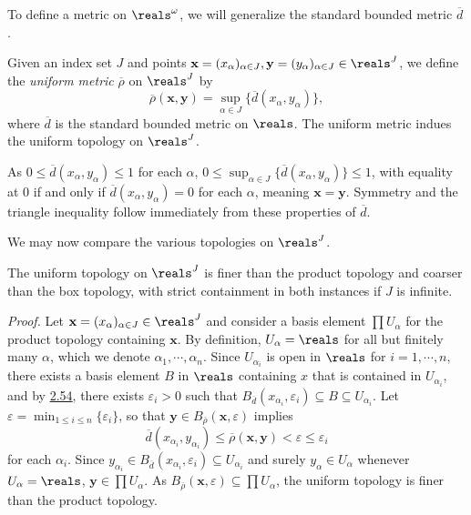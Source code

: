 To define a metric on $\reals^\omega$, we will generalize the standard bounded metric $\overline{d}$.
\begin{definition}\label{2.61}
    Given an index set $J$ and points $\mathbf{x} = (x_\alpha)_{\alpha \in J}, \mathbf{y} = (y_\alpha)_{\alpha \in J} \in \reals^J$, we define the {\it uniform metric} $\overline{\rho}$ on $\reals^J$ by
    $$\overline{\rho}(\mathbf{x}, \mathbf{y}) = \sup_{\alpha \in J} \{\overline{d}(x_\alpha, y_\alpha)\},$$
    where $\overline{d}$ is the standard bounded metric on $\reals$. The uniform metric indues the uniform topology on $\reals^J$.
\end{definition}
As $0 \leq \overline{d}(x_\alpha, y_\alpha) \leq 1$ for each $\alpha$, $0 \leq \sup_{\alpha \in J} \{\overline{d}(x_\alpha, y_\alpha)\} \leq 1$, with equality at $0$ if and only if $\overline{d}(x_\alpha, y_\alpha) = 0$ for each $\alpha$, meaning $\mathbf{x} = \mathbf{y}$. Symmetry and the triangle inequality follow immediately from these properties of $\overline{d}$.

We may now compare the various topologies on $\reals^J$.
\begin{theorem}\label{2.62}
    The uniform topology on $\reals^J$ is finer than the product topology and coarser than the box topology, with strict containment in both instances if $J$ is infinite.
\end{theorem}
{\it Proof.} Let $\mathbf{x} = (x_\alpha)_{\alpha \in J} \in \reals^J$ and consider a basis element $\prod U_\alpha$ for the product topology containing $\mathbf{x}$. By definition, $U_\alpha = \reals$ for all but finitely many $\alpha$, which we denote $\alpha_1, \cdots, \alpha_n$. Since $U_{\alpha_i}$ is open in $\reals$ for $i = 1, \cdots, n,$ there exists a basis element $B$ in $\reals$ containing $x$ that is contained in $U_{\alpha_i}$, and by \hyperref[2.54]{2.54}, there exists $\varepsilon_i > 0$ such that $B_{\overline{d}}(x_{\alpha_i}, \varepsilon_i) \subseteq B \subseteq U_{\alpha_i}$. Let $\varepsilon = \min_{1 \leq i \leq n} \{\varepsilon_i\}$, so that $\mathbf{y} \in B_{\overline{\rho}}(\mathbf{x}, \varepsilon)$ implies
$$\overline{d}(x_{\alpha_i}, y_{\alpha_i}) \leq \overline{\rho}(\mathbf{x}, \mathbf{y}) < \varepsilon \leq \varepsilon_i$$
for each $\alpha_i$. Since $y_{\alpha_i} \in B_{\overline{d}}(x_{\alpha_i}, \varepsilon_i) \subseteq U_{\alpha_i}$ and surely $y_\alpha \in U_\alpha$ whenever $U_\alpha = \reals$, $\mathbf{y} \in \prod U_\alpha$. As $B_{\overline{\rho}}(\mathbf{x}, \varepsilon) \subseteq \prod U_\alpha$, the uniform topology is finer than the product topology.

